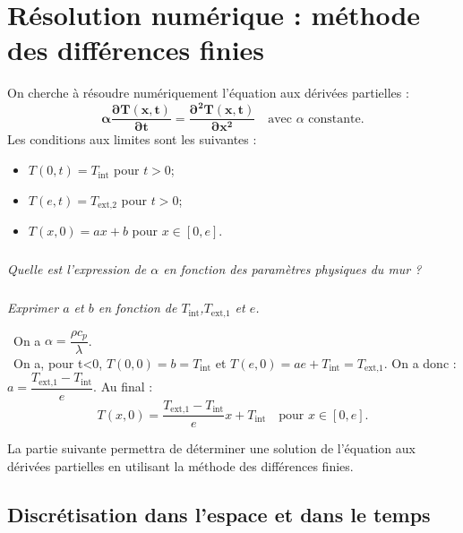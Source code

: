 \section{Résolution numérique : méthode des différences finies}

\ifprof
\else
On cherche à résoudre numériquement l'équation aux dérivées partielles : 
\begin{equation}
\mathbf{\alpha \dfrac{\partial T(x,t)}{\partial t} = \dfrac{\partial^2 T(x,t)}{\partial x^2}} \quad \text{avec }\alpha \text{ constante.}
\end{equation}
Les conditions aux limites sont les suivantes :
\begin{itemize}
\item $T(0,t)=T_{\text{int}}$ pour $t>0$;
\item $T(e,t)=T_{\text{ext,2}}$ pour $t>0$;
\item $T(x,0)=ax + b$ pour $x\in[0,e]$.
\end{itemize}

\subparagraph{}\textit{Quelle est l'expression de $\alpha$ en fonction des paramètres physiques du mur ?}


\subparagraph{\label{q_tini}}\textit{Exprimer $a$ et $b$ en fonction de $T_{\text{int}}$,$T_{\text{ext,1}}$ et $e$.}
\fi

\ifprof
\begin{corrige}
\question\
On a $\alpha =\dfrac{\rho c_p}{\lambda}$.\\

\question\
On a, pour t<0, $T(0,0)= b = T_{\text{int}}$ et  $T(e,0)= ae+ T_{\text{int}}= T_{\text{ext,1}}$. On a donc : $a= \dfrac{T_{\text{ext,1}}- T_{\text{int}}}{e}$. Au final :
$$T(x,0)=\dfrac{T_{\text{ext,1}}- T_{\text{int}}}{e} x + T_{\text{int}} \quad \text{pour } x\in[0,e].$$
\end{corrige}
\else
\vspace{.5cm}

La partie suivante permettra de déterminer une solution de l'équation aux dérivées partielles en utilisant la méthode des différences finies.

\fi

\subsection{Discrétisation dans l'espace et dans le temps}

\ifprof
\else

